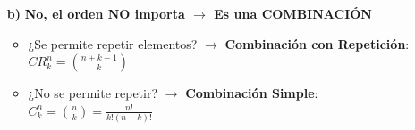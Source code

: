\documentclass[12pt, letterpaper]{article}
\begin{document}
\begin{enumerate}[label=\bfseries, wide]
\begin{itemize}
        \item[\bfseries b)] \textbf{No, el orden NO importa $\rightarrow$ Es una COMBINACIÓN}
            \begin{itemize}
                \item ¿Se permite repetir elementos? $\rightarrow$ \textbf{Combinación con Repetición}: $CR_k^n = \binom{n+k-1}{k}$
                \item ¿No se permite repetir? $\rightarrow$ \textbf{Combinación Simple}: $C_k^n = \binom{n}{k} = \frac{n!}{k!(n-k)!}$
            \end{itemize}
    \end{itemize}
\end{enumerate}


\end{document}
